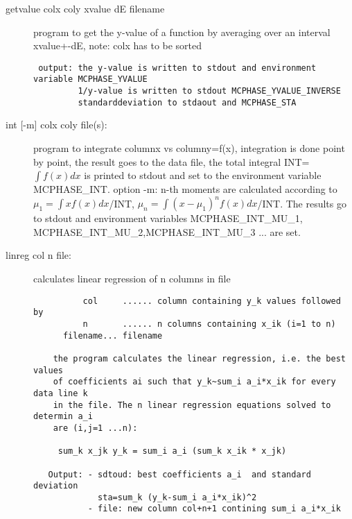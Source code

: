 \begin{description}
\item[\prg getvalue colx coly xvalue dE filename]
program to get the y-value of a function by averaging
 over an interval xvalue+-dE,
 note: colx has to be sorted
\begin{verbatim}
 output: the y-value is written to stdout and environment variable MCPHASE_YVALUE
         1/y-value is written to stdout MCPHASE_YVALUE_INVERSE
         standarddeviation to stdaout and MCPHASE_STA
\end{verbatim}
\item[\prg int {[-m] }colx coly file(s):]
 program  to integrate columnx vs columny=f(x), integration is done 
point by point, the result goes to the data file, the total integral 
INT=$\int f(x)dx$ is printed to stdout and set to the 
 environment variable MCPHASE\_INT.
 option -m: n-th moments are calculated according to $\mu_1=\int x f(x)dx$/INT, $\mu_n=\int (x-\mu_1)^n f(x)dx$/INT.
The results go to stdout and environment variables MCPHASE\_INT\_MU\_1,
  MCPHASE\_INT\_MU\_2,MCPHASE\_INT\_MU\_3 ... are set.
\item [\prg linreg col n file:] calculates linear regression of n columns in file
\begin{verbatim}
          col     ...... column containing y_k values followed by
          n       ...... n columns containing x_ik (i=1 to n)
	  filename... filename

    the program calculates the linear regression, i.e. the best values
    of coefficients ai such that y_k~sum_i a_i*x_ik for every data line k
    in the file. The n linear regression equations solved to determin a_i
    are (i,j=1 ...n):

     sum_k x_jk y_k = sum_i a_i (sum_k x_ik * x_jk)

   Output: - sdtoud: best coefficients a_i  and standard deviation
             sta=sum_k (y_k-sum_i a_i*x_ik)^2
           - file: new column col+n+1 contining sum_i a_i*x_ik
\end{verbatim}


\end{description}
